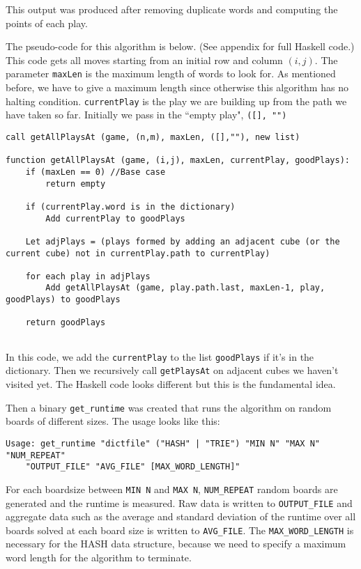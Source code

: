 \documentclass{article}
\begin{document}
This output was produced after removing duplicate words and computing the points of each play. 

The pseudo-code for this algorithm is below. (See appendix for full Haskell code.) This code gets all moves starting from an initial row and column $(i,j)$. The parameter \verb=maxLen= is the maximum length of words to look for. As mentioned before, we have to give a maximum length since otherwise this algorithm has no halting condition. \verb=currentPlay= is the play we are building up from the path we have taken so far. Initially we pass in the ``empty play", \verb=([], "")=
\\

\begin{lstlisting}
call getAllPlaysAt (game, (n,m), maxLen, ([],""), new list)

function getAllPlaysAt (game, (i,j), maxLen, currentPlay, goodPlays):
	if (maxLen == 0) //Base case
		return empty
		
	if (currentPlay.word is in the dictionary) 
		Add currentPlay to goodPlays
		
	Let adjPlays = (plays formed by adding an adjacent cube (or the current cube) not in currentPlay.path to currentPlay)

	for each play in adjPlays
		Add getAllPlaysAt (game, play.path.last, maxLen-1, play, goodPlays) to goodPlays
		
	return goodPlays
	
\end{lstlisting}

In this code, we add the \verb=currentPlay= to the list \verb=goodPlays= if it's in the dictionary. Then we recursively call \verb=getPlaysAt= on adjacent cubes we haven't visited yet. The Haskell code looks different but this is the fundamental idea.  

Then a binary \verb=get_runtime= was created that runs the algorithm on random boards of different sizes. The usage looks like this:

\begin{verbatim}
Usage: get_runtime "dictfile" ("HASH" | "TRIE") "MIN N" "MAX N" "NUM_REPEAT" 
	"OUTPUT_FILE" "AVG_FILE" [MAX_WORD_LENGTH]"
\end{verbatim}
For each boardsize between \verb=MIN N= and \verb=MAX N=, \verb=NUM_REPEAT= random boards are generated and the runtime is measured.
Raw data is written to \verb=OUTPUT_FILE= and aggregate data such as the average and standard deviation of the runtime over all boards solved at each board size is written to \verb=AVG_FILE=. The \verb=MAX_WORD_LENGTH= is necessary for the HASH data structure, because we need to specify a maximum word length for the algorithm to terminate. 
\end{document}
